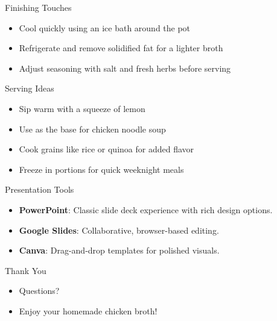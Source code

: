 \documentclass{beamer}
\begin{document}
\begin{frame}{Finishing Touches}
  \begin{itemize}
    \item Cool quickly using an ice bath around the pot
    \item Refrigerate and remove solidified fat for a lighter broth
    \item Adjust seasoning with salt and fresh herbs before serving
  \end{itemize}
\end{frame}

\begin{frame}{Serving Ideas}
  \begin{itemize}
    \item Sip warm with a squeeze of lemon
    \item Use as the base for chicken noodle soup
    \item Cook grains like rice or quinoa for added flavor
    \item Freeze in portions for quick weeknight meals
  \end{itemize}
\end{frame}

\begin{frame}{Presentation Tools}
  \begin{itemize}
    \item \textbf{PowerPoint}: Classic slide deck experience with rich design options.
    \item \textbf{Google Slides}: Collaborative, browser-based editing.
    \item \textbf{Canva}: Drag-and-drop templates for polished visuals.
  \end{itemize}
\end{frame}

\begin{frame}{Thank You}
  \begin{itemize}
    \item Questions?
    \item Enjoy your homemade chicken broth!
  \end{itemize}
\end{frame}
\end{document}
